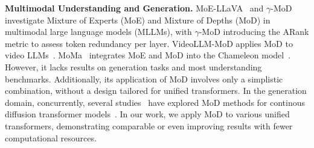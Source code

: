 \textbf{Multimodal Understanding and Generation.} 
MoE-LLaVA~\cite{moellava} and $\gamma$-MoD~\cite{gamma-mod} investigate Mixture of Experts (MoE) and Mixture of Depths (MoD) in multimodal large language models (MLLMs)\cite{llava,llava1.5,qwenvl,llava-next}, with $\gamma$-MoD introducing the ARank metric to assess token redundancy per layer. VideoLLM-MoD\cite{videollmmod} applies MoD to video LLMs~\cite{videollm}. MoMa~\cite{moma} integrates MoE and MoD into the Chameleon model~\cite{team2024chameleon}. However, it lacks results on generation tasks and most understanding benchmarks. Additionally, its application of MoD involves only a simplistic combination, without a design tailored for unified transformers. In the generation domain, concurrently, several studies~\cite{layermoddit,lazydit} have explored MoD methods for continous diffusion transformer models~\cite{dit}. In our work, we apply MoD to various unified transformers, demonstrating comparable or even improving results with fewer computational resources.















